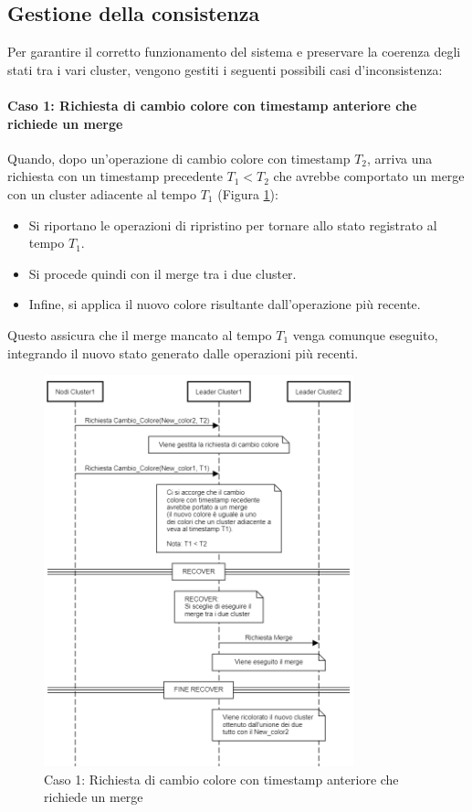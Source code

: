 \documentclass[12pt, a4paper]{report}
\begin{document}
\subsection{Gestione della consistenza}\label{subsec:gestione_consistenza}

Per garantire il corretto funzionamento del sistema e preservare la coerenza degli stati tra i vari cluster, vengono gestiti i seguenti possibili casi d'inconsistenza:

\newpage
\paragraph{Caso 1: Richiesta di cambio colore con timestamp anteriore che richiede un merge}\label{par:case1}

Quando, dopo un'operazione di cambio colore con timestamp $T_2$, arriva una richiesta con un timestamp precedente $T_1 < T_2$ che avrebbe comportato un merge con un cluster adiacente al tempo $T_1$ (Figura \ref{fig:caso1_concorrenza}):

\begin{itemize}
    \item Si riportano le operazioni di ripristino per tornare allo stato registrato al tempo $T_1$.
    \item Si procede quindi con il merge tra i due cluster.
    \item Infine, si applica il nuovo colore risultante dall'operazione più recente.
\end{itemize}

Questo assicura che il merge mancato al tempo $T_1$ venga comunque eseguito, integrando il nuovo stato generato dalle operazioni più recenti.

\begin{figure}[H]
    \centering
    \includegraphics[width=0.8\textwidth,align=t]{images/concorrenza/caso1.png}
    \caption{Caso 1: Richiesta di cambio colore con timestamp anteriore che richiede un merge}
    \label{fig:caso1_concorrenza}
\end{figure}
\end{document}
